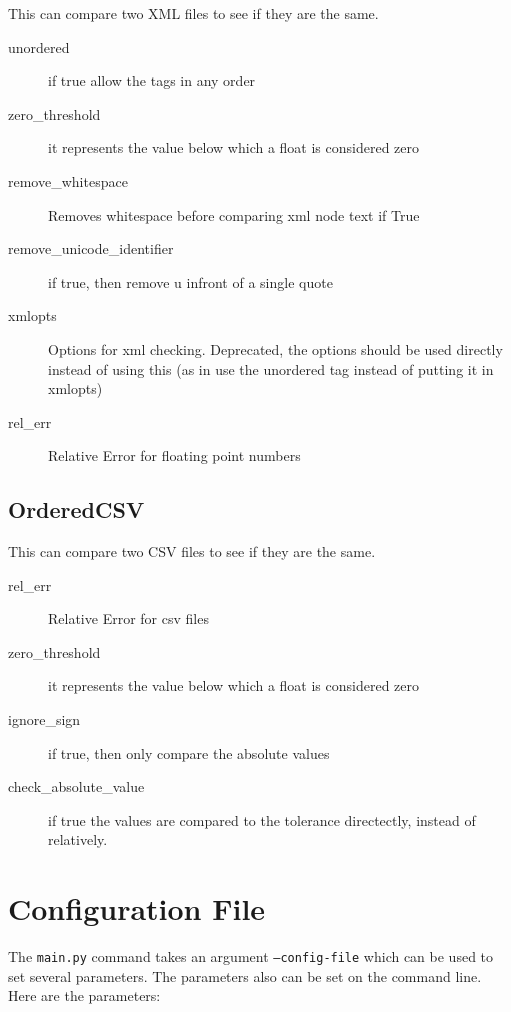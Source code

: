 \documentclass{article}
\begin{document}
This can compare two XML files to see if they are the same.

\begin{description}
  \item[unordered] if true allow the tags in any order
  \item[zero\_threshold] it represents the value below which a float is considered zero
  \item[remove\_whitespace] Removes whitespace before comparing xml node text if True
  \item[remove\_unicode\_identifier] if true, then remove u infront of a single quote
  \item[xmlopts] Options for xml checking. Deprecated, the options should be used directly instead of using this (as in use the unordered tag instead of putting it in xmlopts)
  \item[rel\_err] Relative Error for floating point numbers
\end{description}

\subsection{OrderedCSV}

This can compare two CSV files to see if they are the same.

\begin{description}
  \item[rel\_err] Relative Error for csv files
  \item[zero\_threshold] it represents the value below which a float is considered zero
  \item[ignore\_sign] if true, then only compare the absolute values
  \item[check\_absolute\_value] if true the values are compared to the tolerance directectly, instead of relatively.
\end{description}

\section{Configuration File}

The {\tt main.py} command takes an argument {\tt --config-file} which can be used to set several parameters.  The parameters also can be set on the command line.  Here are the parameters:
\end{document}
